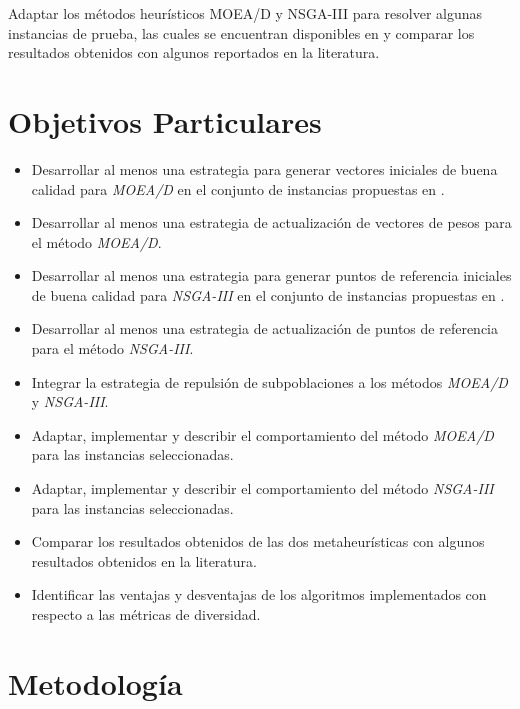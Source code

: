 \documentclass[letterpaper,10pt]{article}
\begin{document}
Adaptar los métodos heurísticos MOEA/D y NSGA-III para resolver algunas instancias de prueba, las cuales se encuentran disponibles en \cite{zhang2008multiobjective} y comparar los resultados obtenidos con algunos reportados en la literatura.

\section{Objetivos Particulares}

\begin{itemize}
\item Desarrollar al menos una estrategia para generar vectores iniciales de buena calidad para \emph{MOEA/D} en el conjunto de instancias propuestas en \cite{zhang2008multiobjective}.

\item Desarrollar al menos una estrategia de actualización de vectores de pesos para el método \emph{MOEA/D}.

\item Desarrollar al menos una estrategia para generar puntos de referencia iniciales de buena calidad para \emph{NSGA-III} en el conjunto de instancias propuestas en \cite{zhang2008multiobjective}.

\item Desarrollar al menos una estrategia de actualización de puntos de referencia para el método \emph{NSGA-III}.

\item Integrar la estrategia de repulsión de subpoblaciones\cite{ahrari2016multimodal} a los métodos \emph{MOEA/D} y \emph{NSGA-III}.

\item Adaptar, implementar y describir el comportamiento del método \emph{MOEA/D} para las instancias seleccionadas.
 
\item Adaptar, implementar y describir el comportamiento del método \emph{NSGA-III} para las instancias seleccionadas.

\item Comparar los resultados obtenidos de las dos metaheurísticas con algunos resultados obtenidos en la literatura.

\item Identificar las ventajas y desventajas de los algoritmos implementados con respecto a las métricas de diversidad.
\end{itemize}


\section{Metodología}
\end{document}
